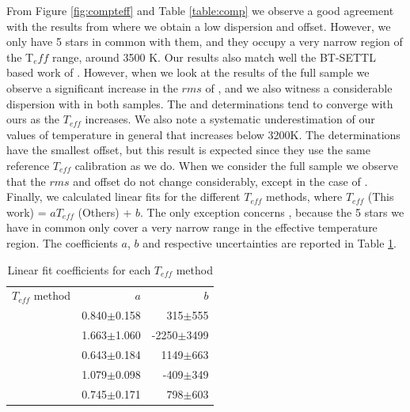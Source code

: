 \documentclass{aa}
\begin{document}
From Figure \ref{fig:compteff} and Table \ref{table:comp} we observe a good agreement with the results from \citet{Woolf-2005} where we obtain a low dispersion and offset. However, we only have 5 stars in common with them, and they occupy a very narrow region of the T${_eff}$ range, around 3500 K. Our results also match well the BT-SETTL based work of \citet{Rajpurohit-2013a}. However, when we look at the results of the full sample we observe a significant increase in the $rms$ of \citet{Rajpurohit-2013a}, and we also witness a considerable dispersion with \citet{Rojas-Ayala-2012} in both samples. The \citet{Onehag-2012} and \citet{Boyajian-2012} determinations tend to converge with ours as the $T_{eff}$ increases. 
We also note a systematic underestimation of our values of temperature in general that increases below 3200K. The \citet{Onehag-2012} determinations have the smallest offset, but this result is expected since they use the same reference $T_{eff}$ calibration as we do. When we consider the full sample we observe that the $rms$ and offset do not change considerably, except in the case of \citet{Rajpurohit-2013a}.
Finally, we calculated linear fits  for the different $T_{eff}$ methods, where $T_{eff}$ (This work) = $aT_{eff}$ (Others) + $b$. The only exception concerns \citet{Woolf-2005}, because the 5 stars we have in common only cover a very narrow range in the effective temperature region. The coefficients $a$, $b$ and respective uncertainties are reported in Table \ref{table:fit_teff}.

\begin{table}[]
\centering
\caption[]{Linear fit coefficients for each $T_{eff}$ method}
\label{table:fit_teff}
\begin{tabular}{l r r}
\hline
\hline
$T_{eff}$ method & $a$ & $b$ \\
\citet{Rojas-Ayala-2012}  &  0.840$\pm$0.158 & 315$\pm$555 \\
\citet{Onehag-2012} &  1.663$\pm$1.060 & -2250$\pm$3499 \\
\citet{Mann-2013b}  &  0.643$\pm$0.184 & 1149$\pm$663 \\
\citet{Boyajian-2012} &  1.079$\pm$0.098 & -409$\pm$349 \\
\citet{Rajpurohit-2013a}  &  0.745$\pm$0.171 & 798$\pm$603 \\
\hline
\end{tabular}
\end{table}
\end{document}
